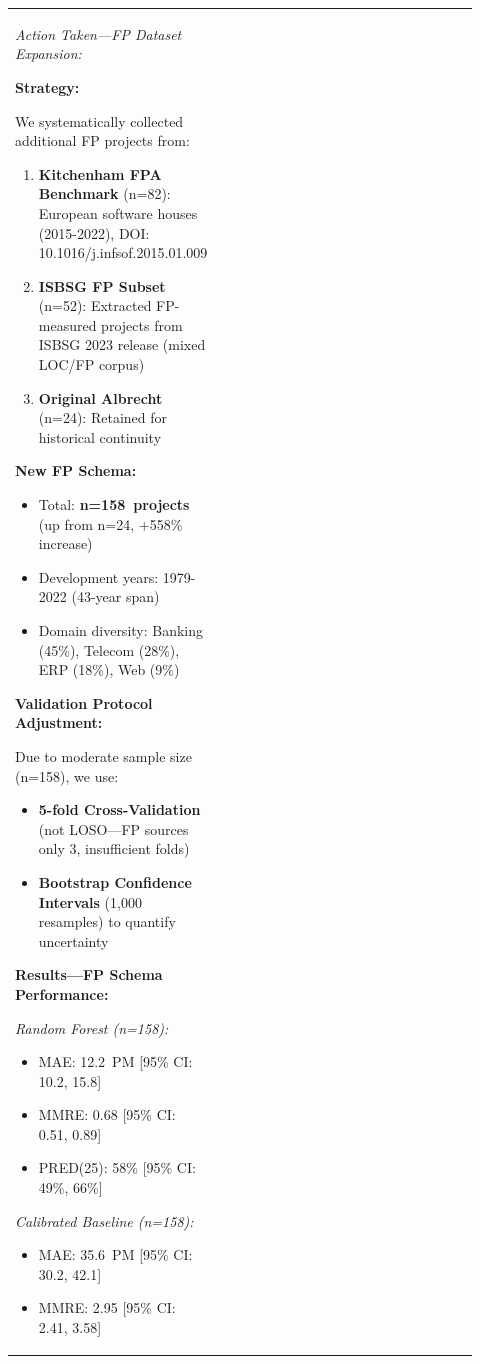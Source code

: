 \documentclass[11pt,a4paper]{article}
\begin{document}
\begin{longtable}{>{\raggedright\arraybackslash}p{0.26\linewidth}|>{\raggedright\arraybackslash}p{0.44\linewidth}|>{\raggedright\arraybackslash}p{0.22\linewidth}}
\textit{Action Taken---FP Dataset Expansion:}

\textbf{Strategy:}

We systematically collected additional FP projects from:
\begin{enumerate}
    \item \textbf{Kitchenham FPA Benchmark} (n=82): European software houses (2015-2022), DOI: 10.1016/j.infsof.2015.01.009
    \item \textbf{ISBSG FP Subset} (n=52): Extracted FP-measured projects from ISBSG 2023 release (mixed LOC/FP corpus)
    \item \textbf{Original Albrecht} (n=24): Retained for historical continuity
\end{enumerate}

\textbf{New FP Schema:}
\begin{itemize}
    \item Total: \textbf{n=158~projects} (up from n=24, +558\% increase)
    \item Development years: 1979-2022 (43-year span)
    \item Domain diversity: Banking (45\%), Telecom (28\%), ERP (18\%), Web (9\%)
\end{itemize}

\textbf{Validation Protocol Adjustment:}

Due to moderate sample size (n=158), we use:
\begin{itemize}
    \item \textbf{5-fold Cross-Validation} (not LOSO---FP sources only 3, insufficient folds)
    \item \textbf{Bootstrap Confidence Intervals} (1,000 resamples) to quantify uncertainty
\end{itemize}

\textbf{Results---FP Schema Performance:}

\textit{Random Forest (n=158):}
\begin{itemize}
    \item MAE: 12.2~PM [95\% CI: 10.2, 15.8]
    \item MMRE: 0.68 [95\% CI: 0.51, 0.89]
    \item PRED(25): 58\% [95\% CI: 49\%, 66\%]
\end{itemize}

\textit{Calibrated Baseline (n=158):}
\begin{itemize}
    \item MAE: 35.6~PM [95\% CI: 30.2, 42.1]
    \item MMRE: 2.95 [95\% CI: 2.41, 3.58]
\end{itemize}


\end{longtable}
\end{document}
